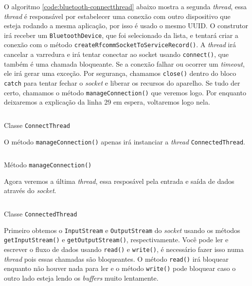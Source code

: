 \documentclass[a4paper,12pt,brazil]{book}
\begin{document}
\begin{singlespace}
	O algoritmo \ref{code:bluetooth-connectthread} abaixo mostra a segunda \emph{thread}, essa \emph{thread} é responsável por estabelecer uma conexão com outro dispositivo que esteja rodando a mesma aplicação, por isso é usado o mesmo UUID. O construtor irá receber um \texttt{BluetoothDevice}, que foi selecionado da lista, e tentará criar a conexão com o método \texttt{createRfcommSocketToServiceRecord()}. A \emph{thread} irá cancelar a varredura e irá tentar conectar ao socket usando \texttt{connect()}, que também é uma chamada bloqueante. Se a conexão falhar ou ocorrer um \emph{timeout}, ele irá gerar uma exceção. Por segurança, chamamos \texttt{close()} dentro do bloco \texttt{catch} para tentar fechar o \emph{socket} e liberar os recursos do aparelho. Se tudo der certo, chamamos o método \texttt{manageConnection()} que veremos logo. Por enquanto deixaremos a explicação da linha 29 em espera, voltaremos logo nela.

	\begin{listing}[H]
	\inputminted[linenos=true,fontsize=\small,frame=lines, framesep=2mm, tabsize=2,numbersep=5pt]{java}{src/api/bluetooth/connectthread.java}
	\caption{Classe \texttt{ConnectThread}}
	\label{code:bluetooth-connectthread}
	\end{listing} 	

	O método \texttt{manageConnection()} apenas irá instanciar a \emph{thread} \texttt{ConnectedThread}.

	\begin{listing}[H]
	\inputminted[linenos=true,fontsize=\small,frame=lines, framesep=2mm, tabsize=2,numbersep=5pt]{java}{src/api/bluetooth/manage.java}
	\caption{Método \texttt{manageConnection()}}
	\label{code:bluetooth-manage}
	\end{listing} 	

	Agora veremos a última \emph{thread}, essa resposável pela entrada e saída de dados através do \emph{socket}.

	\begin{listing}[H]
	\inputminted[linenos=true,fontsize=\small,frame=lines, framesep=2mm, tabsize=2,numbersep=5pt]{java}{src/api/bluetooth/connected.java}
	\caption{Classe \texttt{ConnectedThread}}
	\label{code:bluetooth-connected}
	\end{listing} 	

	Primeiro obtemos o \texttt{InputStream} e \texttt{OutputStream} do \emph{socket} usando os métodos \texttt{getInputStream()} e \texttt{getOutputStream()}, respectivamente. Você pode ler e escrever o fluxo de dados usando \texttt{read()} e \texttt{write()}, é necessário fazer isso numa \emph{thread} pois essas chamadas são bloqueantes. O método \texttt{read()} irá bloquear enquanto não houver nada para ler e o método \texttt{write()} pode bloquear caso o outro lado esteja lendo os \emph{buffers} muito lentamente. 


\end{singlespace}
\end{document}
